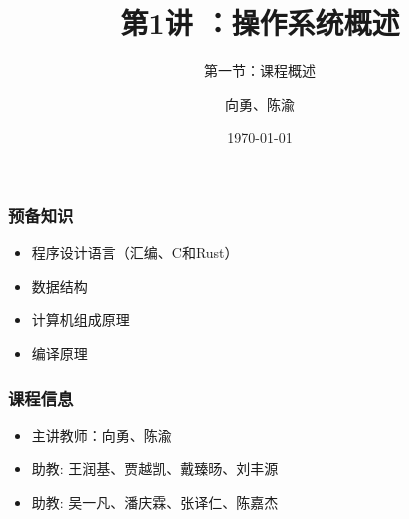 \documentclass[UTF8]{ctexbeamer}
\title[第1讲]{第1讲 ：操作系统概述} %
\subtitle{第一节：课程概述}
\author{向勇、陈渝} %
\institute[清华大学] %
{
清华大学计算机系 \\ %
\medskip
\textit{xyong,yuchen@tsinghua.edu.cn} %
}
\date{\today} %
\begin{document}
\begin{frame}
\titlepage %
\end{frame}

%
%

\begin{frame}

\frametitle{预备知识}

\begin{itemize}

\item 程序设计语言（汇编、C和Rust）

\item 数据结构

\item 计算机组成原理

\item 编译原理

\end{itemize}

\end{frame}

\begin{frame}
	\frametitle{课程信息}
	\begin{itemize}
		\item 主讲教师：向勇、陈渝
		\item 助教: 王润基、贾越凯、戴臻旸、刘丰源
		\item 助教: 吴一凡、潘庆霖、张译仁、陈嘉杰
	\end{itemize}
\end{frame}
\end{document}
